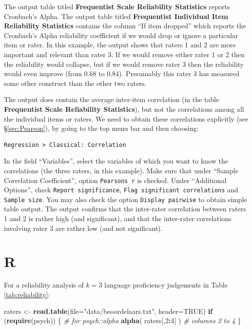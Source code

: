 \documentclass[
]{book}
\newenvironment{Shaded}{\begin{snugshade}}{\end{snugshade}}
\newcommand{\CommentTok}[1]{\textcolor[rgb]{0.56,0.35,0.01}{\textit{#1}}}
\newcommand{\ControlFlowTok}[1]{\textcolor[rgb]{0.13,0.29,0.53}{\textbf{#1}}}
\newcommand{\DataTypeTok}[1]{\textcolor[rgb]{0.13,0.29,0.53}{#1}}
\newcommand{\DecValTok}[1]{\textcolor[rgb]{0.00,0.00,0.81}{#1}}
\newcommand{\KeywordTok}[1]{\textcolor[rgb]{0.13,0.29,0.53}{\textbf{#1}}}
\newcommand{\NormalTok}[1]{#1}
\newcommand{\OperatorTok}[1]{\textcolor[rgb]{0.81,0.36,0.00}{\textbf{#1}}}
\newcommand{\OtherTok}[1]{\textcolor[rgb]{0.56,0.35,0.01}{#1}}
\newcommand{\StringTok}[1]{\textcolor[rgb]{0.31,0.60,0.02}{#1}}
\begin{document}
The output table titled \textbf{Frequentist Scale Reliability Statistics} reports Cronbach's Alpha.
The output table titled \textbf{Frequentist Individual Item Reliability Statistics} contains the column ``If item dropped'' which reports the Cronbach's Alpha reliability coefficient if we would drop or ignore a particular item or rater. In this example, the output shows that raters 1 and 2 are more important and relevant than rater 3. If we would remove either rater 1 or 2 then the reliability would collapse, but if we would remove rater 3 then the reliability would even improve (from 0.68 to 0.84). Presumably this rater 3 has measured some other construct than the other two raters.

The output does contain the average inter-item correlation (in the table \textbf{Frequentist Scale Reliability Statistics}), but not the correlations among all the individual items or raters.
We need to obtain these correlations explicitly (see §\ref{sec:Pearson}), by going to the top menu bar and then choosing:

\begin{verbatim}
Regression > Classical: Correlation
\end{verbatim}

In the field ``Variables'', select the variables of which you want to know the correlations (the three raters, in this example).
Make sure that under ``Sample Correlation Coefficient'', option \texttt{Pearson\textquotesingle{}s\ r} is checked.
Under ``Additional Options'', check \texttt{Report\ significance}, \texttt{Flag\ significant\ correlations} and \texttt{Sample\ size}. You may also check the option \texttt{Display\ pairwise} to obtain simple table output. The output confirms that the inter-rater correlation between raters 1 and 2 is rather high (and significant), and that the inter-rater correlations involving rater 3 are rather low (and not significant).

\hypertarget{r-10}{%
\section{R}\label{r-10}}

For a reliability analysis of \(k=3\) language proficiency
judgements in Table \ref{tab:reliability}:\\

\begin{Shaded}
\begin{Highlighting}[]
\NormalTok{raters \textless{}{-}}\StringTok{ }\KeywordTok{read.table}\NormalTok{(}\DataTypeTok{file=}\StringTok{"data/beoordelaars.txt"}\NormalTok{, }\DataTypeTok{header=}\OtherTok{TRUE}\NormalTok{)}
\ControlFlowTok{if}\NormalTok{ (}\KeywordTok{require}\NormalTok{(psych)) \{ }\CommentTok{\# for psych::alpha}
  \KeywordTok{alpha}\NormalTok{( raters[,}\DecValTok{2}\OperatorTok{:}\DecValTok{4}\NormalTok{] ) }\CommentTok{\# columns 2 to 4}
\NormalTok{\}}
\end{Highlighting}
\end{Shaded}
\end{document}
